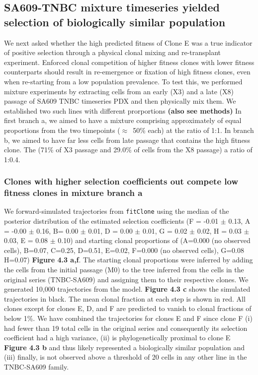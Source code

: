 \subsection{SA609-TNBC mixture timeseries yielded selection of biologically similar population}
We next asked whether the high predicted fitness of Clone E was a true indicator of positive selection through a physical clonal mixing and re-transplant experiment. Enforced clonal competition of higher fitness clones with lower fitness counterparts should result in re-emergence or fixation of high fitness clones, even when re-starting from a low population prevalence. To test this, we performed mixture experiments by extracting cells from an early (X3) and a late (X8) passage of SA609 TNBC timeseries PDX
and then physically mix them. We established two such lines with different prorportions \textbf{(also see methods)}
In first branch a, we aimed to have a mixture comprising approximately of equal proportions from the two
timepoints ($\approx$~50\% each) at the ratio of 1:1. In branch b, we aimed to have far less cells from late passage that contains the high fitness clone. The (71\% of X3 passage and 29.0\% of cells from the X8 passage) a ratio of 1:0.4.


\subsubsection{Clones with higher selection coefficients out compete low fitness clones in mixture branch a}
We forward-simulated trajectories from \texttt{fitClone} using the median of the posterior distribution of the estimated selection coefficients (F = -0.01  $\pm$ 0.13, A = -0.00 $\pm$ 0.16, B= 0.00 $\pm$  0.01, D = 0.00  $\pm$  0.01, G = 0.02  $\pm$  0.02, H = 0.03  $\pm$  0.03, E = 0.08  $\pm$ 0.10) and starting clonal proportions of (A=0.000 (no observed cells), B=0.07, C=0.25, D=0.51, E=0.02, F=0.000 (no observed cells), G=0.08 H=0.07) \textbf{Figure 4.3 a,f}. The starting clonal proportions were inferred by adding the cells from the initial passage (M0) to the tree inferred from the cells in the original series (TNBC-SA609) and assigning them to their respective clones. We generated 10,000 trajectories from the model. \textbf{Figure 4.3 c} shows the simulated trajectories in black.
The mean clonal fraction at each step is shown in red. All clones except for clones E, D, and F are predicted to vanish to clonal fractions of below 1\%. We have combined the trajectories for clones E and F since clone F (i) had fewer than 19 total cells in the original series and consequently its selection coefficient had a high variance, (ii) is phylogenetically proximal to clone E \textbf{Figure 4.3 b} and thus likely represented a biologically similar population and (iii) finally, is not observed above a threshold of 20 cells in any other line in the TNBC-SA609 family.

